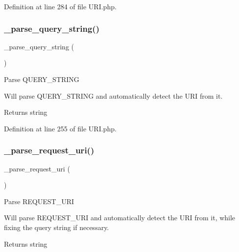 Definition at line 284 of file U\+R\+I.\+php.

\mbox{\label{class_c_i___u_r_i_a2bb6abbe64a923ffef79a4a4c3da93db}} 
\subsubsection{\texorpdfstring{\_parse\_query\_string()}{\_parse\_query\_string()}}
{\footnotesize\ttfamily \+\_\+parse\+\_\+query\+\_\+string (\begin{DoxyParamCaption}{ }\end{DoxyParamCaption})\hspace{0.3cm}{\ttfamily [protected]}}

Parse Q\+U\+E\+R\+Y\+\_\+\+S\+T\+R\+I\+NG

Will parse Q\+U\+E\+R\+Y\+\_\+\+S\+T\+R\+I\+NG and automatically detect the U\+RI from it.

\begin{DoxyReturn}{Returns}
string 
\end{DoxyReturn}


Definition at line 255 of file U\+R\+I.\+php.

\mbox{\label{class_c_i___u_r_i_ae2e75a6f6657df51c7b6de926979af29}} 
\subsubsection{\texorpdfstring{\_parse\_request\_uri()}{\_parse\_request\_uri()}}
{\footnotesize\ttfamily \+\_\+parse\+\_\+request\+\_\+uri (\begin{DoxyParamCaption}{ }\end{DoxyParamCaption})\hspace{0.3cm}{\ttfamily [protected]}}

Parse R\+E\+Q\+U\+E\+S\+T\+\_\+\+U\+RI

Will parse R\+E\+Q\+U\+E\+S\+T\+\_\+\+U\+RI and automatically detect the U\+RI from it, while fixing the query string if necessary.

\begin{DoxyReturn}{Returns}
string 
\end{DoxyReturn}


